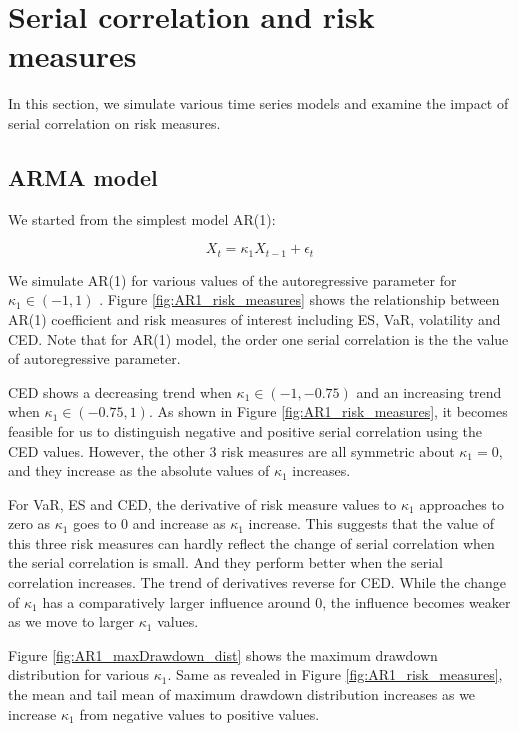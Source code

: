 \documentclass[11pt]{article}
\begin{document}
\section{Serial correlation and risk measures}

In this section, we simulate various time series models and examine the impact of serial correlation on risk measures.

\subsection{ARMA model}

We started from the simplest model AR(1):

\begin{equation}
X_t = \kappa_1X_{t-1} + \epsilon_t
\end{equation}

We simulate AR(1) for various values of the autoregressive parameter for $\kappa_1 \in (-1, 1)$ . Figure \ref{fig:AR1_risk_measures} shows the relationship between AR(1) coefficient and risk measures of interest including ES, VaR, volatility and CED. Note that for AR(1) model, the order one serial correlation is the the value of autoregressive parameter.

CED shows a decreasing trend when $\kappa_1\in(-1, -0.75)$ and an increasing trend when $\kappa_1 \in(-0.75, 1)$. As shown in Figure \ref{fig:AR1_risk_measures}, it becomes feasible for us to distinguish negative and positive serial correlation using the CED values. However, the other 3 risk measures are all symmetric about $\kappa_1 = 0$, and they increase as the absolute values of $\kappa_1$ increases.

For VaR, ES and CED, the derivative of risk measure values to $\kappa_1$ approaches to zero as  $\kappa_1$ goes to 0 and increase as $\kappa_1$ increase. This suggests that the value of this three risk measures can hardly reflect the change of serial correlation when the serial correlation is small. And they perform better when the serial correlation increases. The trend of derivatives reverse for CED. While the change of $\kappa_1$ has a comparatively larger influence around 0, the influence becomes weaker as we move to larger  $\kappa_1$ values.

Figure \ref{fig:AR1_maxDrawdown_dist} shows the maximum drawdown distribution for various $\kappa_1$. Same as revealed in Figure \ref{fig:AR1_risk_measures}, the mean and tail mean of maximum drawdown distribution increases as we increase $\kappa_1$ from negative values to positive values.
\end{document}
